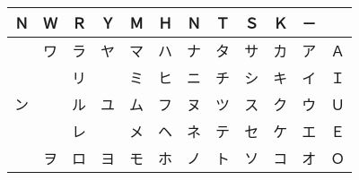 \begin{center}
\begin{tabular}{|c|cccccccccc|c|}
\hline
Ｎ & Ｗ & Ｒ & Ｙ & Ｍ & Ｈ & Ｎ & Ｔ & Ｓ & Ｋ & － & 　 \\\hline
　 & ワ & ラ & ヤ & マ & ハ & ナ & タ & サ & カ & ア & Ａ \\
　 & 　 & リ & 　 & ミ & ヒ & ニ & チ & シ & キ & イ & Ｉ \\
ン & 　 & ル & ユ & ム & フ & ヌ & ツ & ス & ク & ウ & Ｕ \\
　 & 　 & レ & 　 & メ & ヘ & ネ & テ & セ & ケ & エ & Ｅ \\
　 & ヲ & ロ & ヨ & モ & ホ & ノ & ト & ソ & コ & オ & Ｏ \\
\hline
\end{tabular}
\end{center}
